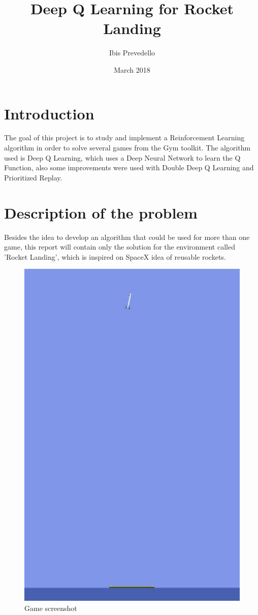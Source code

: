 \documentclass{article}
\title{Deep Q Learning for Rocket Landing}
\date{March 2018}
\author{Ibis Prevedello}
\begin{document}
\maketitle

\section{Introduction}
The goal of this project is to study and implement a Reinforcement Learning algorithm in order to solve several games from the Gym toolkit. The algorithm used is Deep Q Learning, which uses a Deep Neural Network to learn the Q Function, also some improvements were used with Double Deep Q Learning and Prioritized Replay.

\section{Description of the problem}
Besides the idea to develop an algorithm that could be used for more than one game, this report will contain only the solution for the environment called 'Rocket Landing', which is inspired on SpaceX idea of reusable rockets.

\begin{figure}[h]
\centering
\includegraphics[scale=0.2]{environment}
\caption{Game screenshot}
\label{fig:fig1}
\end{figure}
\end{document}
